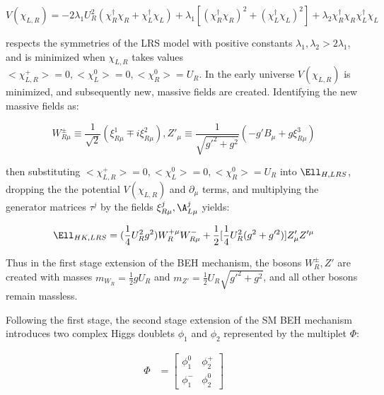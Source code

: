 \begin{equation}
	V(\chi_{L,R}) = -2\lambda_{1}U^{2}_{R}(\chi^{\dagger}_{R}\chi_{R} + \chi^{\dagger}_{L}\chi_{L}) + \lambda_{1}[(\chi^{\dagger}_{R}\chi_{R})^{2} + (\chi^{\dagger}_{L}\chi_{L})^{2}] + \lambda_{2}\chi^{\dagger}_{R}\chi_{R}\chi^{\dagger}_{L}\chi_{L}
\end{equation}

respects the symmetries of the LRS model with positive constants $\lambda_{1}, \lambda_{2} > 2\lambda_{1}$, and is minimized when $\chi_{L,R}$ 
takes values $<\chi^{+}_{L,R}> = 0, <\chi^{0}_{L}> = 0, <\chi^{0}_{R}> = U_{R}$.  In the early universe $V(\chi_{L,R})$ is minimized, and 
subsequently new, massive fields are created.  Identifying the new massive fields as:

\begin{equation}
	W^{\pm}_{R\mu} \equiv \frac{1}{\sqrt{2}}(\xi^{1}_{R\mu} \mp i\xi^{2}_{R\mu}), 
	Z'_{\mu} \equiv \frac{1}{\sqrt{g'^{2} + g^{2}}}(-g'B_{\mu} + g\xi^{3}_{R\mu})
\end{equation}

then substituting $<\chi^{+}_{L,R}> = 0, <\chi^{0}_{L}> = 0, <\chi^{0}_{R}> = U_{R}$ into $\Ell_{H,LRS}$, dropping the the potential $V(\chi_{L,R})$ 
and $\partial_{\mu}$ terms, and multiplying the generator matrices $\tau^{j}$ by the fields $\xi^{j}_{R\mu},\A^{j}_{L\mu}$ yields:

\begin{equation}
	\Ell_{HK,LRS} = (\frac{1}{4}U^{2}_{R}g^{2})W^{+\mu}_{R}W^{-}_{R\mu} + \frac{1}{2}[\frac{1}{4}U^{2}_{R}(g^{2} + g'^{2})]Z'_{\mu}Z'^{\mu}
\end{equation}

Thus in the first stage extension of the BEH mechanism, the bosons $W^{\pm}_{R}, Z'$ are created with masses $m_{W_{R}} = \frac{1}{2}gU_{R}$ 
and $m_{Z'} = \frac{1}{2}U_{R}\sqrt{g'^{2} + g^{2}}$, and all other bosons remain massless.

Following the first stage, the second stage extension of the SM BEH mechanism \cite{lrsHiggsStageOne,lrsHiggsStageTwo} introduces two complex Higgs doublets 
$\phi_{1}$ and $\phi_{2}$ represented by the multiplet $\Phi$:

\begin{align}
	\Phi &= \begin{bmatrix}
	\phi^{0}_{1} & \phi^{+}_{2} \\
	\phi^{-}_{1} & \phi^{0}_{2}
	\end{bmatrix}
\end{align}

